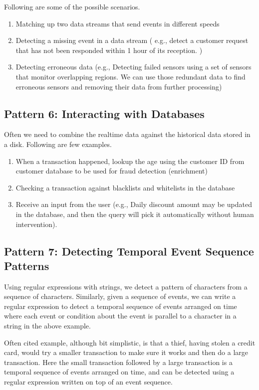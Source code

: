 \documentclass{sig-alternate}
\begin{document}
Following are some of the possible scenarios. 

\begin{enumerate}
\item Matching up two data streams that send events in different speeds 
\item  Detecting a missing event in a data stream ( e.g., detect a customer request that has not been responded within 1 hour of its reception. )
\item Detecting erroneous data (e.g., Detecting failed sensors using a set of sensors that monitor overlapping regions. We can use those redundant data to find erroneous sensors and removing their data from further processing) 
\end{enumerate}

\subsection{Pattern 6: Interacting with Databases}
Often we need to combine the realtime data against the historical data stored in a disk. 
Following are few examples. 
\begin{enumerate}
\item When a transaction happened, lookup the age using the customer ID from customer database to be used for fraud detection (enrichment) 
\item Checking a transaction against blacklists and whitelists in the database 
\item Receive an input from the user (e.g., Daily discount amount may be updated in the database, and then the query will pick it automatically without human intervention). 
\end{enumerate}


\subsection{Pattern 7: Detecting Temporal Event Sequence Patterns}
Using regular expressions with strings, we detect a pattern of characters from a sequence of characters.  Similarly, given a sequence of events, we can write a regular expression to detect a temporal sequence of events arranged on time where each event or condition about the event is parallel to a character in a string in the above example. 

Often cited example, although bit simplistic,  is that a thief,  having stolen a credit card, would try a smaller transaction to make sure it works and then do a large transaction. Here the small transaction followed by a large transaction is a temporal sequence of events arranged on time, and can be detected using a regular expression written on top of an event sequence. 
\end{document}
